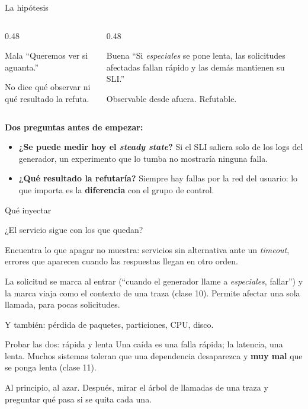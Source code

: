 \documentclass[institutional,screen,none]{ua-engineering-v6-beamer}
\begin{document}
\begin{frame}{La hipótesis}
\begin{columns}[T,onlytextwidth]
\begin{column}{0.48\textwidth}
\begin{alertblock}{Mala}
``Queremos ver si aguanta.''
\end{alertblock}
{\small No dice qué observar ni qué resultado la refuta.}
\end{column}
\begin{column}{0.48\textwidth}
\begin{block}{Buena}
``Si \emph{especiales} se pone lenta, las solicitudes afectadas fallan rápido y las demás mantienen su SLI.''
\end{block}
{\small Observable desde afuera. Refutable.}
\end{column}
\end{columns}

\pause

\vspace{0.6em}
\textbf{Dos preguntas antes de empezar:}
\begin{itemize}\small
\item \textbf{¿Se puede medir hoy el \emph{steady state}?} Si el SLI saliera solo de los logs del generador, un experimento que lo tumba no mostraría ninguna falla.
\item \textbf{¿Qué resultado la refutaría?} Siempre hay fallas por la red del usuario: lo que importa es la \textbf{diferencia} con el grupo de control.
\end{itemize}
\end{frame}

\begin{frame}{Qué inyectar}
\begin{description}\small
\item[\textbf{Apagar servidores.}] ¿El servicio sigue con los que quedan?
\item[\textbf{Agregar latencia.}] Encuentra lo que apagar no muestra: servicios sin alternativa ante un \emph{timeout}, errores que aparecen cuando las respuestas llegan en otro orden.
\item[\textbf{Hacer fallar una llamada.}] La solicitud se marca al entrar (``cuando el generador llame a \emph{especiales}, fallar'') y la marca viaja como el contexto de una traza (clase 10). Permite afectar una sola llamada, para pocas solicitudes.
\end{description}

\pause

{\small Y también: pérdida de paquetes, particiones, CPU, disco.}

\begin{alertblock}{Probar las dos: rápida y lenta}
Una caída es una falla rápida; la latencia, una lenta. Muchos sistemas toleran que una dependencia desaparezca y \textbf{muy mal} que se ponga lenta (clase 11).
\end{alertblock}

{\small Al principio, al azar. Después, mirar el árbol de llamadas de una traza y preguntar qué pasa si se quita cada una.}
\end{frame}
\end{document}
